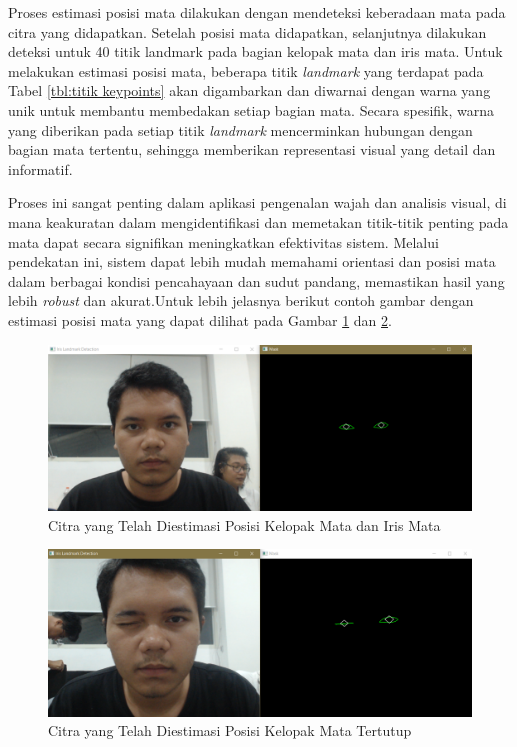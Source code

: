 Proses estimasi posisi mata dilakukan dengan mendeteksi keberadaan mata pada citra yang didapatkan. Setelah posisi mata didapatkan, selanjutnya dilakukan deteksi untuk 40 titik landmark pada bagian kelopak mata dan iris mata. Untuk melakukan estimasi posisi mata, beberapa titik \emph{landmark} yang terdapat pada Tabel \ref{tbl:titik keypoints} akan digambarkan dan diwarnai dengan warna yang unik untuk membantu membedakan setiap bagian mata. Secara spesifik, warna yang diberikan pada setiap titik \emph{landmark} mencerminkan hubungan dengan bagian mata tertentu, sehingga memberikan representasi visual yang detail dan informatif.

Proses ini sangat penting dalam aplikasi pengenalan wajah dan analisis visual, di mana keakuratan dalam mengidentifikasi dan memetakan titik-titik penting pada mata dapat secara signifikan meningkatkan efektivitas sistem. Melalui pendekatan ini, sistem dapat lebih mudah memahami orientasi dan posisi mata dalam berbagai kondisi pencahayaan dan sudut pandang, memastikan hasil yang lebih \emph{robust} dan akurat.Untuk lebih jelasnya berikut contoh gambar dengan estimasi posisi mata yang dapat dilihat pada Gambar \ref{fig:contoh citra yang telah diestimasi pose} dan \ref{fig:citratertutup}. 

\begin{figure} [ht] \centering
    \includegraphics[scale=0.35]{gambar/bab3/iris.png}
    \caption{Citra yang Telah Diestimasi Posisi Kelopak Mata dan Iris Mata}
    \label{fig:contoh citra yang telah diestimasi pose}
\end{figure}

\begin{figure} [ht] \centering
  \includegraphics[scale=0.35]{gambar/bab3/stop.png}
  \caption{Citra yang Telah Diestimasi Posisi Kelopak Mata Tertutup}
  \label{fig:citratertutup}
\end{figure}

